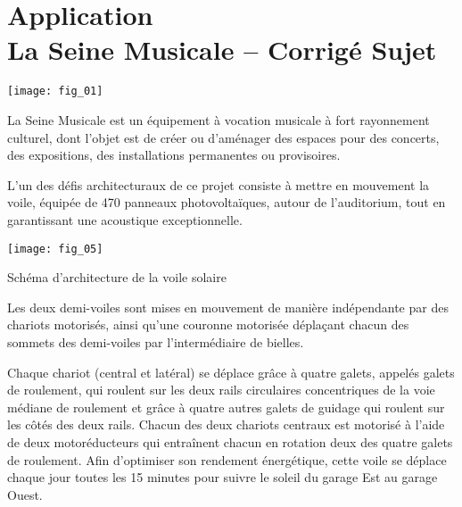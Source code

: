 \chapter*{Application  \\ La Seine Musicale -- \ifprof Corrigé \else Sujet \fi}
\setcounter{question}{0}
\iflivret {} \else
\ifprof  {} \else \fi
\fi

\begin{marginfigure}
\texttt{[image: fig\_01]}
\end{marginfigure}

\ifprof
\else
La Seine Musicale est un équipement à vocation musicale à fort rayonnement culturel, dont l’objet est de créer
ou d’aménager des espaces pour des concerts, des expositions, des installations permanentes ou provisoires.

L’un des défis architecturaux de ce projet consiste à mettre en mouvement la voile, %
équipée de 470 panneaux photovoltaïques, autour de l’auditorium, tout en garantissant une acoustique exceptionnelle.

\begin{marginfigure}
\texttt{[image: fig\_05]}
\caption{Schéma d’architecture de la voile solaire \label{fig_05}}
\end{marginfigure}

Les deux demi-voiles sont mises en mouvement de manière indépendante par des chariots motorisés, ainsi qu’une couronne motorisée déplaçant chacun des sommets des demi-voiles par l’intermédiaire
de bielles. 

Chaque chariot (central et latéral) se déplace grâce à quatre galets, appelés galets de roulement, qui roulent
sur les deux rails circulaires concentriques de la voie médiane de roulement et grâce à quatre autres galets de
guidage qui roulent sur les côtés des deux rails. Chacun des deux chariots centraux est motorisé à l’aide de deux
motoréducteurs qui entraînent chacun en rotation deux des quatre galets de roulement.
Afin d’optimiser son rendement énergétique, cette voile se déplace chaque jour toutes les 15 minutes pour suivre
le soleil du garage Est au garage Ouest.%

